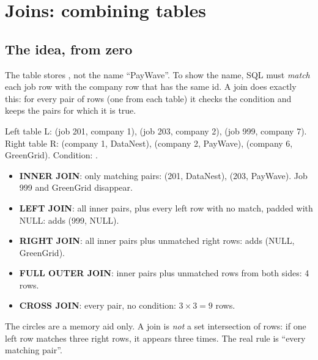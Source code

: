 \section{Joins: combining tables}
\subsection{The idea, from zero}
The  table stores , not the name ``PayWave''. To show the name, SQL must \emph{match} each job row with the company row
that has the same id. A join does exactly this: for every pair of rows (one from each table) it checks the  condition and keeps the pairs for
which it is true.

\begin{example}
Left table L: (job 201, company 1), (job 203, company 2), (job 999, company 7). Right table R: (company 1, DataNest), (company 2, PayWave),
(company 6, GreenGrid). Condition: .
\begin{itemize}
\item \textbf{INNER JOIN}: only matching pairs: (201, DataNest), (203, PayWave). Job 999 and GreenGrid disappear.
\item \textbf{LEFT JOIN}: all inner pairs, plus every left row with no match, padded with NULL: adds (999, NULL).
\item \textbf{RIGHT JOIN}: all inner pairs plus unmatched right rows: adds (NULL, GreenGrid).
\item \textbf{FULL OUTER JOIN}: inner pairs plus unmatched rows from both sides: 4 rows.
\item \textbf{CROSS JOIN}: every pair, no condition: $3 \times 3 = 9$ rows.
\end{itemize}
\end{example}

\begin{center}
\end{center}
The circles are a memory aid only. A join is \emph{not} a set intersection of rows: if one left row matches three right rows, it appears three times.
The real rule is ``every matching pair''.

